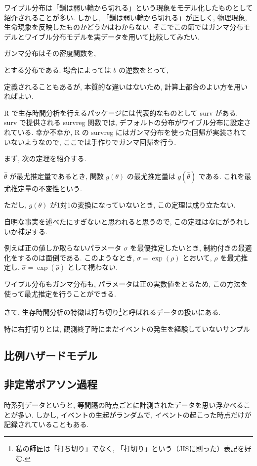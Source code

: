 \documentclass[a4paper, 12pt]{jarticle}
\begin{document}
ワイブル分布は「鎖は弱い輪から切れる」という現象をモデル化したものとして紹介されることが多い.
しかし, 「鎖は弱い輪から切れる」が正しく, 物理現象, 生命現象を反映したものかどうかはわからない.
そこでこの節ではガンマ分布モデルとワイブル分布モデルを実データを用いて比較してみたい.

ガンマ分布はその密度関数を,

とする分布である. 場合によっては $b$ の逆数をとって,

定義されることもあるが, 本質的な違いはないため, 計算上都合のよい方を用いればよい.

R で生存時間分析を行えるパッケージには代表的なものとして surv がある. 
surv で提供される survreg 関数では, デフォルトの分布がワイブル分布に設定されている.
幸か不幸か, R の survreg にはガンマ分布を使った回帰が実装されていないようなので, ここでは手作りでガンマ回帰を行う. 

まず, 次の定理を紹介する. 

\begin{theorem}
$\hat \theta$ が最尤推定量であるとき, 関数 $g(\theta)$ の最尤推定量は $g(\hat \theta)$ である. これを最尤推定量の不変性という.
\end{theorem}
ただし, $g(\theta)$ が1対1の変換になっていないとき, この定理は成り立たない. 

自明な事実を述べたにすぎないと思われると思うので, この定理はなにがうれしいか補足する.

例えば正の値しか取らないパラメータ $\sigma$ を最優推定したいとき, 制約付きの最適化をするのは面倒である. このようなとき, $\sigma=\exp(\rho)$ とおいて, $\rho$ を最尤推定し, $\hat \sigma =\exp(\hat \rho)$ として構わない. 

ワイブル分布もガンマ分布も, パラメータは正の実数値をとるため, この方法を使って最尤推定を行うことができる.

さて, 生存時間分析の特徴は打ち切り\footnote{私の師匠は「打ち切り」でなく, 「打切り」という（JISに則った）表記を好む.}と呼ばれるデータの扱いにある.

特に右打切りとは, 観測終了時にまだイベントの発生を経験していないサンプル

\subsection{比例ハザードモデル}

\subsection{非定常ポアソン過程}
時系列データというと, 等間隔の時点ごとに計測されたデータを思い浮かべることが多い. しかし, イベントの生起がランダムで, イベントの起こった時点だけが記録されていることもある. 
\end{document}
